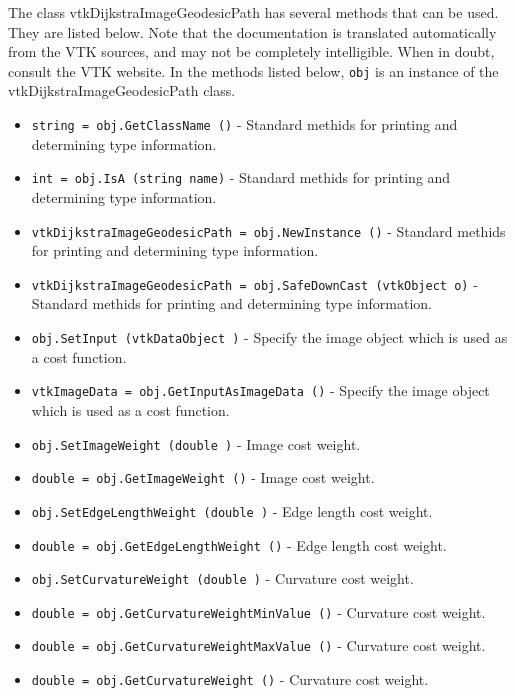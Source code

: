 The class vtkDijkstraImageGeodesicPath has several methods that can be used.
  They are listed below.
Note that the documentation is translated automatically from the VTK sources,
and may not be completely intelligible.  When in doubt, consult the VTK website.
In the methods listed below, \verb|obj| is an instance of the vtkDijkstraImageGeodesicPath class.
\begin{itemize}
\item  \verb|string = obj.GetClassName ()| -  Standard methids for printing and determining type information.

\item  \verb|int = obj.IsA (string name)| -  Standard methids for printing and determining type information.

\item  \verb|vtkDijkstraImageGeodesicPath = obj.NewInstance ()| -  Standard methids for printing and determining type information.

\item  \verb|vtkDijkstraImageGeodesicPath = obj.SafeDownCast (vtkObject o)| -  Standard methids for printing and determining type information.

\item  \verb|obj.SetInput (vtkDataObject )| -  Specify the image object which is used as a cost function.

\item  \verb|vtkImageData = obj.GetInputAsImageData ()| -  Specify the image object which is used as a cost function.

\item  \verb|obj.SetImageWeight (double )| -  Image cost weight.

\item  \verb|double = obj.GetImageWeight ()| -  Image cost weight.

\item  \verb|obj.SetEdgeLengthWeight (double )| -  Edge length cost weight.

\item  \verb|double = obj.GetEdgeLengthWeight ()| -  Edge length cost weight.

\item  \verb|obj.SetCurvatureWeight (double )| -  Curvature cost weight.

\item  \verb|double = obj.GetCurvatureWeightMinValue ()| -  Curvature cost weight.

\item  \verb|double = obj.GetCurvatureWeightMaxValue ()| -  Curvature cost weight.

\item  \verb|double = obj.GetCurvatureWeight ()| -  Curvature cost weight.

\end{itemize}
